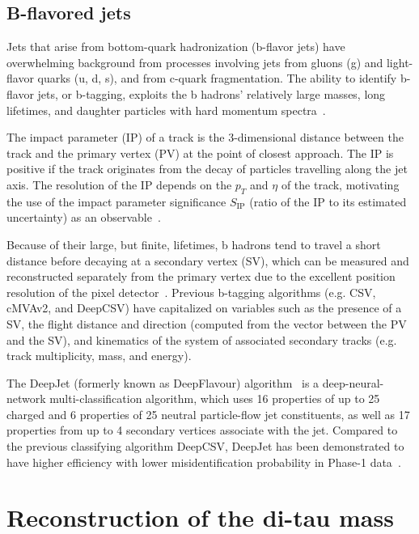 \subsection{B-flavored jets}
\label{section:b-flavour-jets}
Jets that arise from bottom-quark hadronization (b-flavor jets) have overwhelming background from processes involving jets from gluons (g) and light-flavor quarks (u, d, s), and from c-quark fragmentation. The ability to identify b-flavor jets, or b-tagging, exploits the b hadrons' relatively large masses, long lifetimes, and daughter particles with hard momentum spectra~\cite{CMS-BTV-12-001}. 

The impact parameter (IP) of a track is the 3-dimensional distance between the track and the primary vertex (PV) at the point of closest approach. The IP is positive if the track originates from the decay of particles travelling along the jet axis. The resolution of the IP depends on the $p_{T}$ and $\eta$ of the track, motivating the use of the impact parameter significance $S_{\text{IP}}$ (ratio of the IP to its estimated uncertainty) as an observable~\cite{CMS-BTV-12-001}.

Because of their large, but finite, lifetimes, b hadrons tend to travel a short distance before decaying at a secondary vertex (SV), which can be measured and reconstructed separately from the primary vertex due to the excellent position resolution of the pixel detector~\cite{CMS-BTV-12-001}. Previous b-tagging algorithms (e.g. CSV, cMVAv2, and DeepCSV) have capitalized on variables such as the presence of a SV, the flight distance and direction (computed from the vector between the PV and the SV), and kinematics of the system of associated secondary tracks (e.g. track multiplicity, mass, and energy). 

The DeepJet (formerly known as DeepFlavour) algorithm~\cite{CMS-DP-2017-013} is a deep-neural-network multi-classification algorithm, which uses 16 properties of up to 25 charged and 6 properties of 25 neutral particle-flow jet constituents, as well as 17 properties from up to 4 secondary vertices associate with the jet. Compared to the previous classifying algorithm DeepCSV, DeepJet has been demonstrated to have higher efficiency with lower misidentification probability in Phase-1 data~\cite{CMS-DP-2018-058}. 



\section{Reconstruction of the di-tau mass}
\label{section:svfit}

